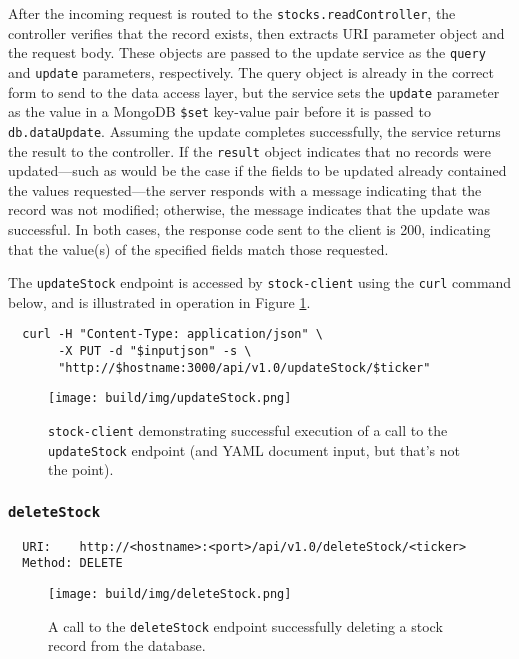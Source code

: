 \documentclass[
11pt,
titlepage,
]{article}
\begin{document}
After the incoming request is routed to the \texttt{stocks.readController}, the
controller verifies that the record exists, then extracts URI parameter object
and the request body. These objects are passed to the update service as the
\texttt{query} and \texttt{update} parameters, respectively. The query object is
already in the correct form to send to the data access layer, but the service
sets the \texttt{update} parameter as the value in a MongoDB \texttt{\$set}
key-value pair before it is passed to \texttt{db.dataUpdate}. Assuming the
update completes successfully, the service returns the result to the controller.
If the \texttt{result} object indicates that no records were updated---such as
would be the case if the fields to be updated already contained the values
requested---the server responds with a message indicating that the record was
not modified; otherwise, the message indicates that the update was successful.
In both cases, the response code sent to the client is 200, indicating that the
value(s) of the specified fields match those requested.

The \texttt{updateStock} endpoint is accessed by \texttt{stock-client} using the
\texttt{curl} command below, and is illustrated in operation in Figure
\ref{fig:updateStock}.

\begin{lstlisting}
  curl -H "Content-Type: application/json" \
       -X PUT -d "$inputjson" -s \
       "http://$hostname:3000/api/v1.0/updateStock/$ticker"
\end{lstlisting}

\begin{figure}[tp]
  \texttt{[image: build/img/updateStock.png]}
  \caption{\texttt{stock-client} demonstrating successful execution of a call to
    the \texttt{updateStock} endpoint (and YAML document input, but that's not
    the point).}
  \label{fig:updateStock}
\end{figure}

\subsubsection{\texttt{deleteStock}}

\begin{lstlisting}
  URI:    http://<hostname>:<port>/api/v1.0/deleteStock/<ticker>
  Method: DELETE
\end{lstlisting}

\begin{figure}[bp]
  \texttt{[image: build/img/deleteStock.png]}
  \caption{A call to the \texttt{deleteStock} endpoint successfully deleting a stock
    record from the database.}
  \label{fig:deleteStock}
\end{figure}
\end{document}
